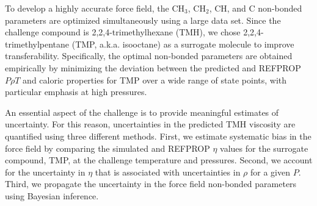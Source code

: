 \documentclass[11pt,a4paper]{article}
\begin{document}
	To develop a highly accurate force field, the CH$_3$, CH$_2$, CH, and C non-bonded parameters are optimized simultaneously using a large data set. Since the challenge compound is 2,2,4-trimethylhexane (TMH), we chose 2,2,4-trimethylpentane (TMP, a.k.a. isooctane) as a surrogate molecule to improve transferability. Specifically, the optimal non-bonded parameters are obtained empirically by minimizing the deviation between the predicted and REFPROP $P\rho T$ and caloric properties for TMP over a wide range of state points, with particular emphasis at high pressures. 
	
	
	
	
	
	An essential aspect of the challenge is to provide meaningful estimates of uncertainty. For this reason, uncertainties in the predicted TMH viscosity are quantified using three different methods. First, we estimate systematic bias in the force field by comparing the simulated and REFPROP $\eta$ values for the surrogate compound, TMP, at the challenge temperature and pressures. Second, we account for the uncertainty in $\eta$ that is associated with uncertainties in $\rho$ for a given $P$. Third, we propagate the uncertainty in the force field non-bonded parameters using Bayesian inference. 
	
\end{document}
